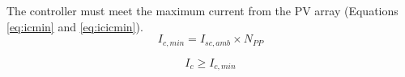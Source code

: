\documentclass[journal]{IEEEtran}
\begin{document}
The controller must meet the maximum current from the PV array (Equations \ref{eq:icmin} and \ref{eq:icicmin}).
\begin{equation}
\label{eq:icmin}
I_{c,min} = I_{sc,amb} \times N_{PP}
\end{equation}

\begin{equation}
\label{eq:icicmin}
I_{c} \geq I_{c,min}
\end{equation}

%
%
%
%
\end{document}
